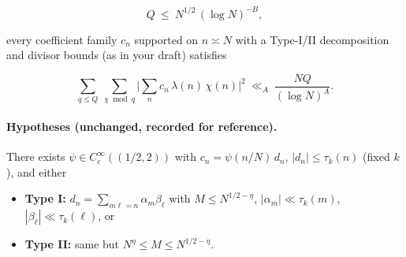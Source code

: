 \documentclass[11pt]{article}
\theoremstyle{definition}
\theoremstyle{remark}
\numberwithin{equation}{part}
\begin{document}
$$
	Q\ \le\ N^{1/2}\,(\log N)^{-B},
$$

every coefficient family $c_n$ supported on $n\asymp N$ with a Type-I/II decomposition and divisor bounds (as in your draft) satisfies

$$
	\sum_{q\le Q}\ \sum_{\chi\bmod q}
	\Bigg|\sum_{n} c_n\,\lambda(n)\,\chi(n)\Bigg|^2
	\ \ll_{A}\ \frac{NQ}{(\log N)^A}.
$$

\paragraph{Hypotheses (unchanged, recorded for reference).}
There exists $\psi\in C_c^\infty((1/2,2))$ with $c_n=\psi(n/N)\,d_n$, $|d_n|\le \tau_k(n)$ (fixed $k$), and either

\begin{itemize}
	\item \textbf{Type I:} $d_n=\sum_{m\ell=n}\alpha_m\beta_\ell$ with $M\le N^{1/2-\eta}$, $|\alpha_m|\ll \tau_k(m)$, $|\beta_\ell|\ll \tau_k(\ell)$, or
	\item \textbf{Type II:} same but $N^{\eta}\le M\le N^{1/2-\eta}$.
\end{itemize}
\end{document}
